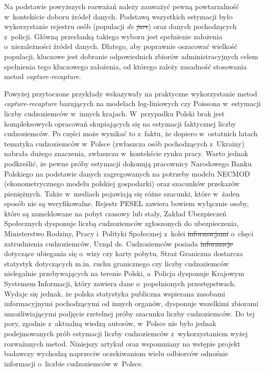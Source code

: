 \documentclass[12pt,a4paper]{article}
\providecommand{\DIFadd}[1]{{\protect\color{blue}\uwave{#1}}} %
\providecommand{\DIFdel}[1]{{\protect\color{red}\sout{#1}}}                      %
\providecommand{\DIFaddbegin}{} %
\providecommand{\DIFaddend}{} %
\providecommand{\DIFdelbegin}{} %
\providecommand{\DIFdelend}{} %
\begin{document}
Na podstawie powyższych rozważań należy zauważyć pewną powtarzalność w~kontekście doboru źródeł danych. Podstawą wszystkich estymacji było wykorzystanie rejestru osób (populacji \textit{de \DIFdelbegin \DIFdel{jure}\DIFdelend \DIFaddbegin \DIFadd{iure}\DIFaddend }) oraz danych pochodzących z~policji. Główną przesłanką takiego wyboru jest spełnienie założenia o~niezależności źródeł danych. Dlatego, aby poprawnie oszacować wielkość populacji, kluczowe jest dobranie odpowiednich zbiorów administracyjnych celem spełnienia tego kluczowego założenia, od którego zależy zasadność stosowania metod \textit{capture-recapture}. 

Powyżej przytoczone przykłady wskazywały na praktyczne wykorzystanie metod \textit{ca\-ptu\-re-recapture} bazujących na modelach log-liniowych czy Poissona w~estymacji liczby cudzoziemców w~innych krajach. W~przypadku Polski brak jest kompleksowych opracowań skupiających się na estymacji faktycznej liczby cudzoziemców. Po części może wynikać to z~faktu, że dopiero w~ostatnich latach tematyka cudzoziemców w~Polsce (zwłaszcza osób pochodzących z~Ukrainy) nabrała dużego znaczenia, zwłaszcza w~kontekście rynku pracy. Warto jednak podkreślić, że pewne próby estymacji dokonują pracownicy Narodowego Banku Polskiego na podstawie danych zagregowanych na potrzeby modelu NECMOD (ekonometrycznego modelu polskiej gospodarki) oraz szacunków przekazów pieniężnych. Także w~mediach pojawiają się różne szacunki, które w~żaden sposób nie są weryfikowalne. Rejestr PESEL zawiera bowiem wyłącznie osoby, które są zameldowane na pobyt czasowy lub stały, Zakład Ubezpieczeń Społecznych dysponuje liczbą cudzoziemców zgłoszonych do ubezpieczenia, Ministerstwo Rodziny, Pracy i~Polityki Społecznej z~kolei \DIFdelbegin \DIFdel{informacjami }\DIFdelend \DIFaddbegin \DIFadd{dysponuje danymi }\DIFaddend o~chęci zatrudnienia cudzoziemców, Urząd ds. Cudzoziemców posiada \DIFdelbegin \DIFdel{informacje }\DIFdelend \DIFaddbegin \DIFadd{dane }\DIFaddend dotyczące ubiegania się o~wizy czy karty pobytu, Straż Graniczna dostarcza statystyk dotyczących m.in. ruchu granicznego czy liczby cudzoziemców nielegalnie przebywających na terenie Polski, a~Policja dysponuje Krajowym Systemem Informacji, który zawiera dane o~popełnionych przestępstwach. Wydaje się jednak, że polska statystyka publiczna wspierana zasobami informacyjnymi pochodzącymi od innych organów, dysponuje wszelkimi zbiorami umożliwiającymi podjęcie rzetelnej próby szacunku liczby cudzoziemców. Do tej pory, zgodnie z~aktualną wiedzą autorów, w~Polsce nie było jednak podejmowanych prób estymacji liczby cudzoziemców z~wykorzystaniem wyżej rozważanych metod. Niniejszy artykuł oraz wspomniany na wstępie projekt badawczy wychodzą naprzeciw oczekiwaniom wielu odbiorców odnośnie informacji o~liczbie cudzoziemców w~Polsce. 
\end{document}
